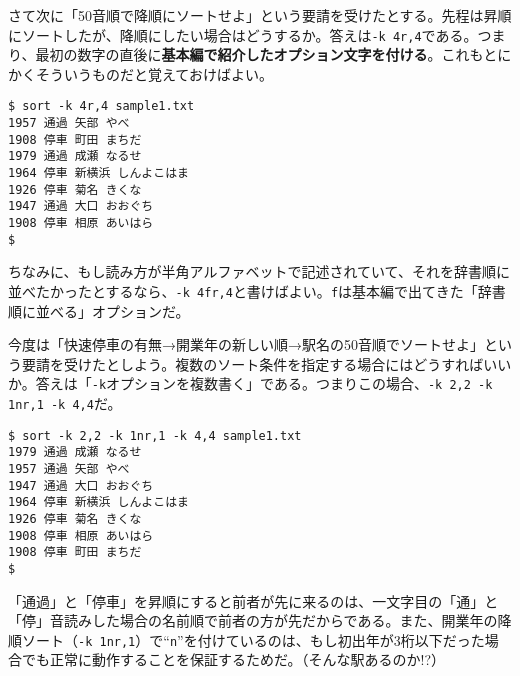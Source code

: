 さて次に「50音順で降順にソートせよ」という要請を受けたとする。先程は昇順にソートしたが、降順にしたい場合はどうするか。答えは\verb|-k 4r,4|である。つまり、最初の数字の直後に\textbf{基本編で紹介したオプション文字を付ける}。これもとにかくそういうものだと覚えておけばよい。
\begin{screen}
	\verb!$ sort -k 4r,4 sample1.txt! \return \\
	\verb!1957 通過 矢部 やべ! \\
	\verb!1908 停車 町田 まちだ! \\
	\verb!1979 通過 成瀬 なるせ! \\
	\verb!1964 停車 新横浜 しんよこはま! \\
	\verb!1926 停車 菊名 きくな! \\
	\verb!1947 通過 大口 おおぐち! \\
	\verb!1908 停車 相原 あいはら! \\
	\verb!$ !
\end{screen}

ちなみに、もし読み方が半角アルファベットで記述されていて、それを辞書順に並べたかったとするなら、\verb|-k 4fr,4|と書けばよい。\verb|f|は基本編で出てきた「辞書順に並べる」オプションだ。

今度は「快速停車の有無→開業年の新しい順→駅名の50音順でソートせよ」という要請を受けたとしよう。複数のソート条件を指定する場合にはどうすればいいか。答えは「\verb|-k|オプションを複数書く」である。つまりこの場合、\verb|-k 2,2 -k 1nr,1 -k 4,4|だ。
\begin{screen}
	\verb!$ sort -k 2,2 -k 1nr,1 -k 4,4 sample1.txt! \return \\
	\verb!1979 通過 成瀬 なるせ! \\
	\verb!1957 通過 矢部 やべ! \\
	\verb!1947 通過 大口 おおぐち! \\
	\verb!1964 停車 新横浜 しんよこはま! \\
	\verb!1926 停車 菊名 きくな! \\
	\verb!1908 停車 相原 あいはら! \\
	\verb!1908 停車 町田 まちだ! \\
	\verb!$ !
\end{screen}

「通過」と「停車」を昇順にすると前者が先に来るのは、一文字目の「通」と「停」音読みした場合の名前順で前者の方が先だからである。また、開業年の降順ソート（\verb|-k 1nr,1|）で``\verb|n|''を付けているのは、もし初出年が3桁以下だった場合でも正常に動作することを保証するためだ。（そんな駅あるのか!?）


